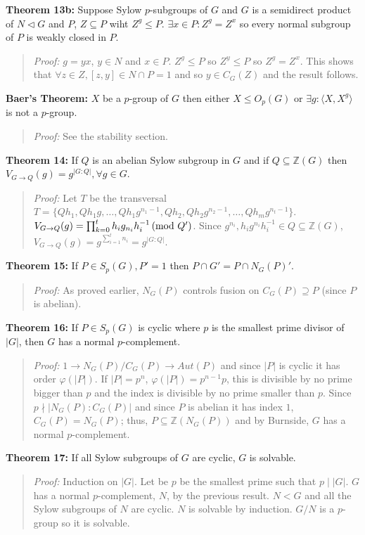 {\bf Theorem 13b:} Suppose Sylow $p$-subgroups of $G$ and $G$ is a semidirect product of $N \lhd G$ and $P$,
$Z \subseteq P$ wiht $Z^g \leq P$. $\exists x \in P: Z^g = Z^x$ so every normal subgroup of $P$ is weakly
closed in $P$.
\begin{quote}
\emph{Proof:} 
$g=yx$, $y \in N$ and $x \in P$.
$Z^g \leq P$ so $Z^y \leq P$ so $Z^g = Z^x$.
This shows that $\forall z \in Z, [z,y] \in N \cap P = 1$ and so
$y \in C_G(Z)$ and the result follows.
\end{quote}
{\bf Baer's Theorem:}
$X$ be a $p$-group of $G$ then either
$X \le O_p(G)$ or $\exists g: \langle X, X^g \rangle $ is not a $p$-group.
\begin{quote}
\emph{Proof:}  
See the stability section.
\end{quote}
{\bf Theorem 14:} If $Q$ is an abelian Sylow subgroup in $G$ and if $Q \subseteq {\mathbb Z}(G)$ then
$V_{G \rightarrow Q}(g)= g^{|G:Q|}, \forall g \in G$.  
\begin{quote}
\emph{Proof:}  
Let $T$ be the transversal 
$T= \{ Qh_1, Qh_1g, \ldots , Qh_1g^{n_1-1}, Qh_2, Qh_2 g^{n_2-1}, \ldots, Qh_m g^{n_t-1} \}$. 
$V_{G \rightarrow Q}(g)= \prod_{k=0}^t h_i g_{n_i} h_i^{-1} \thinspace \textnormal{(mod } Q' \textnormal{)}$.  Since 
$g^{n_i}, h_i g^{n_i} h_i^{-1} \in Q \subseteq {\mathbb Z}(G)$, 
$V_{G \rightarrow Q}(g)= g^{\sum_{i=1}^t n_i} = g^{|G:Q|}$. 
\end{quote}
{\bf Theorem 15:}
If $P \in S_p (G), P'=1$ then $P \cap G' = P \cap N_G(P)'$.
\begin{quote}
\emph{Proof:}  
As proved earlier, $N_G(P)$ controls fusion on $C_G(P) \supseteq P$ (since $P$ is abelian).
\end{quote}
{\bf Theorem 16:} If $P \in S_p(G)$ is cyclic where $p$ is the smallest prime divisor of $|G|$,
then $G$ has a normal $p$-complement.
\begin{quote}
\emph{Proof:}  
$1 \rightarrow N_G(P)/C_G(P) \rightarrow Aut(P)$ and since $|P|$ is cyclic it has order
$\varphi(|P|)$.  If $|P|= p^n$, $\varphi(|P|)= p^{n-1}p$, this is divisible by no prime
bigger than $p$ and the index is divisible by no prime smaller than $p$.  
Since $p \nmid |N_G(P):C_G(P)|$ and since $P$ is abelian it has index $1$, $C_G(P)= N_G(P)$;
thus, $P \subseteq  {\mathbb Z}(N_G(P))$ and by Burnside, $G$ has a normal $p$-complement.
\end{quote}
{\bf Theorem 17:}
If all Sylow subgroups of $G$ are cyclic, $G$ is solvable.  
\begin{quote}
\emph{Proof:}  
Induction on $|G|$.  Let be $p$ be the smallest prime such that $p \mid |G|$.
$G$ has a normal $p$-complement, $N$, by the previous result.  $N < G$ and all the
Sylow subgroups of $N$ are cyclic.  $N$ is solvable by induction. $G/N$ is a $p$-group
so it is solvable.
\end{quote}
